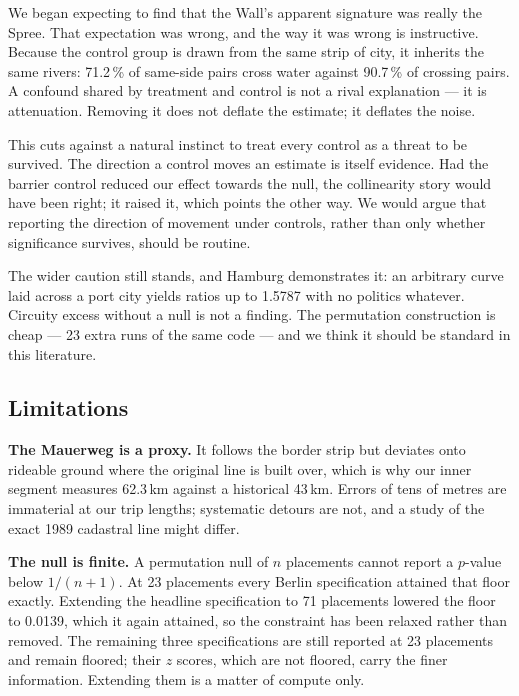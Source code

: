 \documentclass[11pt,a4paper]{article}
\begin{document}
We began expecting to find that the Wall's apparent signature was really the
Spree. That expectation was wrong, and the way it was wrong is instructive.
Because the control group is drawn from the same strip of city, it inherits the
same rivers: 71.2\,\% of same-side pairs cross water against
90.7\,\% of crossing pairs. A confound shared by treatment and
control is not a rival explanation --- it is attenuation. Removing it does not
deflate the estimate; it deflates the noise.

This cuts against a natural instinct to treat every control as a threat to be
survived. The direction a control moves an estimate is itself evidence. Had the
barrier control reduced our effect towards the null, the collinearity story
would have been right; it raised it, which points the other way. We would argue
that reporting the direction of movement under controls, rather than only
whether significance survives, should be routine.

The wider caution still stands, and Hamburg demonstrates it: an arbitrary curve
laid across a port city yields ratios up to 1.5787 with no politics
whatever. Circuity excess without a null is not a finding. The permutation
construction is cheap --- 23 extra runs of the same code --- and we think it
should be standard in this literature.

\subsection{Limitations}\label{sec:limits}

\textbf{The Mauerweg is a proxy.} It follows the border strip but deviates onto
rideable ground where the original line is built over, which is why our inner
segment measures 62.3\,km against a historical 43\,km. Errors of tens of
metres are immaterial at our trip lengths; systematic detours are not, and a
study of the exact 1989 cadastral line might differ.

\textbf{The null is finite.} A permutation null of $n$ placements cannot report
a $p$-value below $1/(n+1)$. At 23 placements every Berlin
specification attained that floor exactly. Extending the headline specification
to 71 placements lowered the floor to 0.0139, which it again attained,
so the constraint has been relaxed rather than removed. The remaining three
specifications are still reported at 23 placements and remain
floored; their $z$ scores, which are not floored, carry the finer information.
Extending them is a matter of compute only.
\end{document}
